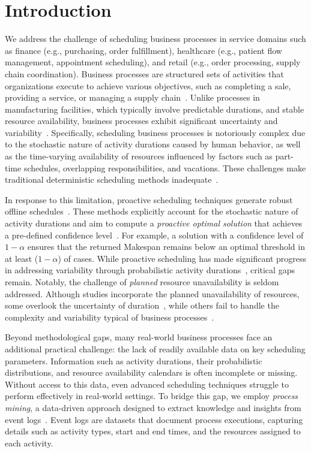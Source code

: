 \section{Introduction}
\label{sec:introduction}

We address the challenge of scheduling business processes in service domains such as finance (e.g., purchasing, order fulfillment), healthcare (e.g., patient flow management, appointment scheduling), and retail (e.g., order processing, supply chain coordination). Business processes are structured sets of activities that organizations execute to achieve various objectives, such as completing a sale, providing a service, or managing a supply chain~\cite{dumas2018fundamentals}. Unlike processes in manufacturing facilities, which typically involve predictable durations, and stable resource availability, business processes exhibit significant uncertainty and variability~\cite{shoush2022intervene,xu2016resource}. 
Specifically, scheduling business processes is notoriously complex due to the stochastic nature of activity durations caused by human behavior, as well as the time-varying availability of resources influenced by factors such as part-time schedules, overlapping responsibilities, and vacations. These challenges make traditional deterministic scheduling methods inadequate~\cite{pinedo2012scheduling}.

In response to this limitation, 
proactive scheduling techniques generate robust offline schedules~\cite{beck2007proactive,chaari2014scheduling}. These methods explicitly account for the stochastic nature of activity durations and aim to compute a \emph{proactive optimal solution} that achieves a pre-defined confidence level~\cite{beck2007proactive}. For example, a solution with a confidence level of \(1-\alpha\) ensures that the returned Makespan remains below an optimal threshold in at least (\(1-\alpha\)) of cases. While proactive scheduling has made significant progress in addressing variability through probabilistic activity durations~\cite{satic2022performance,liu2020multi,hauder2020resource,chen2019research,beck2007proactive}, critical gaps remain. Notably, the challenge of \emph{planned} resource unavailability is seldom addressed. Although studies incorporate the planned unavailability of resources, some overlook the uncertainty of duration~\cite{kreter2018mixed}, while others fail to handle the complexity and variability typical of business processes~\cite{yang2020multi,winklehner2022flexible}.

Beyond methodological gaps, many real-world business processes face an additional practical challenge: the lack of readily available data on key scheduling parameters. Information such as activity durations, their probabilistic distributions, and resource availability calendars is often incomplete or missing. Without access to this data, even advanced scheduling techniques struggle to perform effectively in real-world settings. To bridge this gap, we employ \emph{process mining}, a data-driven approach designed to extract knowledge and insights from event logs~\cite{van2016data}. Event logs are datasets that document process executions, capturing details such as activity types, start and end times, and the resources assigned to each activity. 

